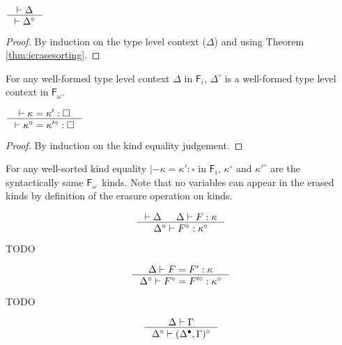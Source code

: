 \documentclass{llncs}
\newcommand{\Fi}{\ensuremath{\mathsf{F}_i}}
\newcommand{\Fw}{\ensuremath{\mathsf{F}_\omega}}
\begin{document}
\begin{theorem}
\label{thm:ierasetyctx}
$ \inference{|- \Delta}{|- \Delta^\circ} $
\end{theorem}
\begin{proof}
	By induction on the type level context ($\Delta$)
	and using Theorem \ref{thm:ierasesorting}.
\end{proof}
\begin{remark}
For any well-formed type level context $\Delta$ in \Fi,
$\Delta^\circ$ is a well-formed type level context in \Fw.
\end{remark}

\begin{theorem}\label{thm:ierasekindeq}
$ \inference{|- \kappa=\kappa':\square}
	{|- \kappa^\circ=\kappa'^\circ:\square}
$
\end{theorem}
\begin{proof}
	By induction on the kind equality judgement.
\end{proof}
\begin{remark}
For any well-sorted kind equality $|- \kappa=\kappa':\square$ in \Fi,
$\kappa^\circ$ and $\kappa'^\circ$ are the syntactically same \Fw\ kinds.
Note that no variables can appear in the erased kinds by definition of
the erasure operation on kinds.
\end{remark}

\begin{theorem}
\label{thm:ierasekinding}
\[ \inference{|- \Delta & \Delta |- F : \kappa}
		{\Delta^\circ |- F^\circ : \kappa^\circ}
\]
\end{theorem}
\begin{remark} TODO
\end{remark}


\begin{theorem}
\label{thm:ierasetyconeq}
\[ \inference{\Delta |- F=F':\kappa}
		{\Delta^\circ |- F^\circ=F'^\circ:\kappa^\circ}
\]
\end{theorem}
\begin{remark} TODO
\end{remark}

\begin{theorem}
\label{thm:ierasetmctxivs}
\[ \inference{\Delta |- \Gamma}{\Delta^\circ |- (\Delta^\bullet,\Gamma)^\circ}
\]
\end{theorem}
\end{document}
